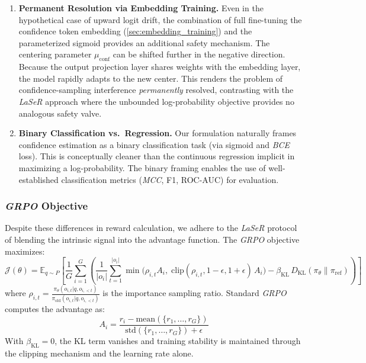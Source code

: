 \documentclass[a4paper,oneside,10pt,ngerman,english]{scrartcl}
\begin{document}
\begin{enumerate}
	\item \textbf{Permanent Resolution via Embedding Training.} Even in the hypothetical case of upward logit drift, the combination of full fine-tuning the confidence token embedding (\autoref{sec:embedding_training}) and the parameterized sigmoid provides an additional safety mechanism. The centering parameter $\mu_{\mathrm{conf}}$ can be shifted further in the negative direction. Because the output projection layer shares weights with the embedding layer, the model rapidly adapts to the new center. This renders the problem of confidence-sampling interference \textit{permanently} resolved, contrasting with the \textit{LaSeR} approach where the unbounded log-probability objective provides no analogous safety valve.

	\item \textbf{Binary Classification vs.\ Regression.} Our formulation naturally frames confidence estimation as a binary classification task (via sigmoid and \textit{BCE} loss). This is conceptually cleaner than the continuous regression implicit in maximizing a log-probability. The binary framing enables the use of well-established classification metrics (\textit{MCC}, F1, ROC-AUC) for evaluation.
\end{enumerate}

\subsubsection{\textit{GRPO} Objective}
Despite these differences in reward calculation, we adhere to the \textit{LaSeR} protocol of blending the intrinsic signal into the advantage function. The \textit{GRPO} objective maximizes:
\begin{equation}
	\mathcal{J}(\theta) = \mathbb{E}_{q \sim P} \left[ \frac{1}{G} \sum_{i=1}^G \left( \frac{1}{|o_i|} \sum_{t=1}^{|o_i|} \min\!\bigl( \rho_{i,t} A_i,\; \mathrm{clip}(\rho_{i,t}, 1{-}\epsilon, 1{+}\epsilon)\, A_i \bigr) - \beta_{\mathrm{KL}}\, D_{\mathrm{KL}}(\pi_\theta \| \pi_{\mathrm{ref}}) \right) \right]
\end{equation}
where $\rho_{i,t} = \frac{\pi_\theta(o_{i,t} | q, o_{i,<t})}{\pi_{\mathrm{old}}(o_{i,t} | q, o_{i,<t})}$ is the importance sampling ratio. Standard \textit{GRPO} computes the advantage as:
\begin{equation}
	A_i = \frac{r_i - \mathrm{mean}(\{r_1, \dots, r_G\})}{\mathrm{std}(\{r_1, \dots, r_G\}) + \epsilon}
\end{equation}
With $\beta_{\mathrm{KL}} = 0$, the KL term vanishes and training stability is maintained through the clipping mechanism and the learning rate alone.
\end{document}
